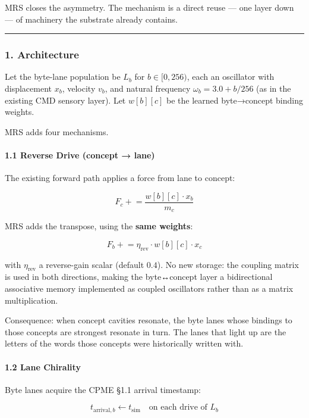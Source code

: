 \documentclass[
  11pt,
  a4paper,
]{article}
\begin{document}
MRS closes the asymmetry. The mechanism is a direct reuse --- one layer
down --- of machinery the substrate already contains.

\begin{center}\rule{0.5\linewidth}{0.5pt}\end{center}

\subsubsection{1. Architecture}\label{architecture-2}

Let the byte-lane population be \(L_b\) for \(b \in [0,256)\), each an
oscillator with displacement \(x_b\), velocity \(v_b\), and natural
frequency \(\omega_b = 3.0 + b/256\) (as in the existing CMD sensory
layer). Let \(w[b][c]\) be the learned byte→concept binding weights.

MRS adds four mechanisms.

\paragraph{1.1 Reverse Drive (concept →
lane)}\label{reverse-drive-concept-lane}

The existing forward path applies a force from lane to concept:

\[ F_c \mathrel{+}= \frac{w[b][c] \cdot x_b}{m_c} \]

MRS adds the transpose, using the \textbf{same weights}:

\[ F_b \mathrel{+}= \eta_{\text{rev}} \cdot w[b][c] \cdot x_c \]

with \(\eta_{\text{rev}}\) a reverse-gain scalar (default \(0.4\)). No
new storage: the coupling matrix is used in both directions, making the
byte↔concept layer a bidirectional associative memory implemented as
coupled oscillators rather than as a matrix multiplication.

Consequence: when concept cavities resonate, the byte lanes whose
bindings to those concepts are strongest resonate in turn. The lanes
that light up are the letters of the words those concepts were
historically written with.

\paragraph{1.2 Lane Chirality}\label{lane-chirality}

Byte lanes acquire the CPME §1.1 arrival timestamp:

\[ t_{\text{arrival},b} \leftarrow t_{\text{sim}} \quad \text{on each drive of } L_b \]
\end{document}

